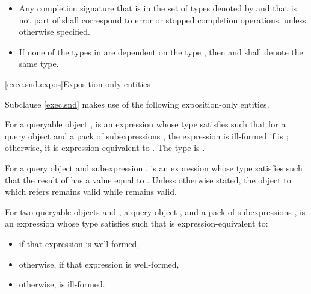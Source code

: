 \begin{itemize}
\item
Any completion signature
that is in the set of types
denoted by  and
that is not part of  shall correspond to
error or stopped completion operations,
unless otherwise specified.

\item
If none of the types in  are dependent on the type , then
 and
shall denote the same type.
\end{itemize}

[exec.snd.expos]{Exposition-only entities}

\pnum
Subclause \ref{exec.snd} makes use of the following exposition-only entities.

\pnum
{}%
For a queryable object ,
 is an expression
whose type satisfies 
such that for a query object  and
a pack of subexpressions ,
the expression  is ill-formed
if  is ;
otherwise, it is expression-equivalent to .
%
The type  is
.

\pnum
For a query object  and  subexpression ,
 is an expression 
whose type satisfies 
such that the result of  has
a value equal to .
Unless otherwise stated,
the object to which  refers remains valid
while  remains valid.

\pnum
For two queryable objects  and ,
a query object , and
a pack of subexpressions ,
 is an expression 
whose type satisfies 
such that  is expression-equivalent to:
\begin{itemize}
\item
{} if that expression is well-formed,
\item
otherwise,  if that expression is well-formed,
\item
otherwise,  is ill-formed.
\end{itemize}

